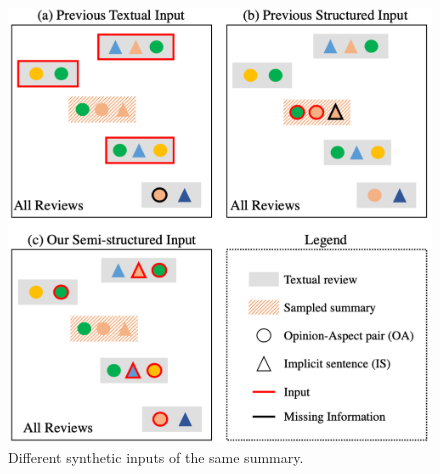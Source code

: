 \begin{figure}[th]
	\centering
	\includegraphics[width=0.85\linewidth]{./brief.pdf}
	\caption{Different synthetic inputs of the same summary.
	}
	\label{fig:brief}
\end{figure}
